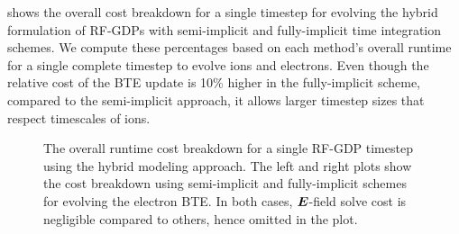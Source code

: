  shows the overall cost breakdown for a single timestep for evolving the hybrid formulation of RF-GDPs with semi-implicit and fully-implicit time integration schemes. We compute these percentages based on each method's overall runtime for a single complete timestep to evolve ions and electrons. Even though the relative cost of the BTE update is 10\% higher in the fully-implicit scheme, compared to the semi-implicit approach, it allows larger timestep sizes that respect timescales of ions. 
\begin{figure}[!tbhp]
	\centering
	\small
\caption{The overall runtime cost breakdown for a single RF-GDP timestep using the hybrid modeling approach. The left and right plots show the cost breakdown using semi-implicit and fully-implicit schemes for evolving the electron BTE. In both cases, $\boldsymbol{E}$-field solve cost is negligible compared to others, hence omitted in the plot. \label{fig:cost_breakdown}}
\end{figure}


